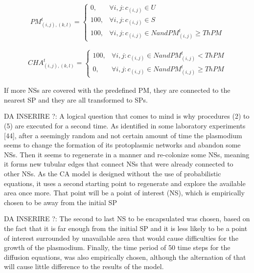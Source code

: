 \begin{equation}
PM^t_{(i, j),(k,l)}=
\begin{cases} 
0, & \forall i, j: c_{(i,j)} \in U \\ 
100, & \forall i, j: c_{(i,j)} \in S \\ 
100, & \forall i, j: c_{(i,j)} \in N and  PM^t_{(i, j)} \geq ThPM 
\end{cases}
\end{equation}

\begin{align}
CHA^t_{(i, j),(k,l)}=
\begin{cases} 
100, & \forall i, j: c_{(i,j)} \in N and PM^t_{(i, j)} < ThPM\\ 
0, & \forall i, j: c_{(i,j)} \in N and  PM^t_{(i, j)} \geq ThPM 
\end{cases}
\end{align}

If more NSs are covered with the predefined PM, they are connected to the nearest SP and they are all transformed to SPs.








\par\par


DA INSERIRE ?: A logical question that comes to mind is why procedures (2) to (5) are executed
for a second time. As identified in some laboratory experiments [44], after a seemingly
random and not certain amount of time the plasmodium seems to change the
formation of its protoplasmic networks and abandon some NSs. Then it seems to
regenerate in a manner and re-colonize some NSs, meaning it forms new tubular
edges that connect NSs that were already connected to other NSs. As the CA model
is designed without the use of probabilistic equations, it uses a second starting point
to regenerate and explore the available area once more. That point will be a point of
interest (NS), which is empirically chosen to be away from the initial SP

DA INSERIRE ?: The second to last NS to
be encapsulated was chosen, based on the fact that it is far enough from the initial
SP and it is less likely to be a point of interest surrounded by unavailable area that
would cause difficulties for the growth of the plasmodium. Finally, the time period
of 50 time steps for the diffusion equations, was also empirically chosen, although
the alternation of that will cause little difference to the results of the model.

